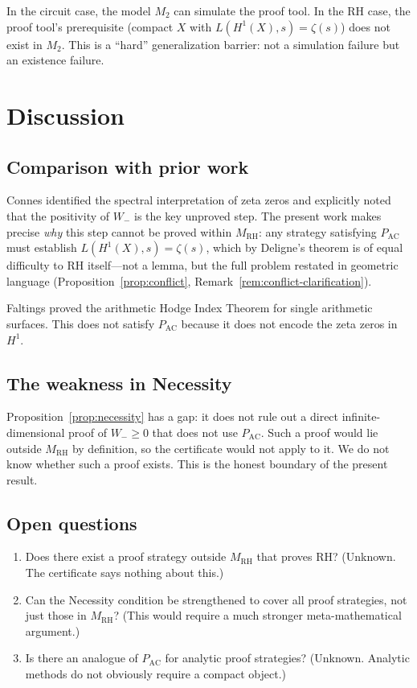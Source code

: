 \documentclass[12pt]{article}
\newcommand{\MRH}{M_{\mathrm{RH}}}
\newcommand{\PAC}{P_{\mathrm{AC}}}
\begin{document}
In the circuit case, the model $M_2$ can simulate the proof tool.
In the RH case, the proof tool's prerequisite (compact $X$ with
$L(H^1(X),s) = \zeta(s)$) does not exist in $M_2$. This is a
``hard'' generalization barrier: not a simulation failure but an
existence failure.

\section{Discussion}
\label{sec:discussion}

\subsection{Comparison with prior work}

Connes \cite{connes1999} identified the spectral interpretation of
zeta zeros and explicitly noted that the positivity of $W_-$ is the
key unproved step. The present work makes precise \emph{why} this
step cannot be proved within $\MRH$: any strategy satisfying $\PAC$
must establish $L(H^1(X),s) = \zeta(s)$, which by Deligne's theorem
is of equal difficulty to RH itself---not a lemma, but the full problem
restated in geometric language (Proposition~\ref{prop:conflict},
Remark~\ref{rem:conflict-clarification}).

Faltings \cite{faltings1984} proved the arithmetic Hodge Index Theorem
for single arithmetic surfaces. This does not satisfy $\PAC$ because
it does not encode the zeta zeros in $H^1$.

\subsection{The weakness in Necessity}

Proposition~\ref{prop:necessity} has a gap: it does not rule out a
direct infinite-dimensional proof of $W_- \geq 0$ that does not use
$\PAC$. Such a proof would lie outside $\MRH$ by definition, so the
certificate would not apply to it. We do not know whether such a proof
exists. This is the honest boundary of the present result.

\subsection{Open questions}

\begin{enumerate}
\item Does there exist a proof strategy outside $\MRH$ that proves RH?
  (Unknown. The certificate says nothing about this.)
\item Can the Necessity condition be strengthened to cover all proof
  strategies, not just those in $\MRH$? (This would require a much
  stronger meta-mathematical argument.)
\item Is there an analogue of $\PAC$ for analytic proof strategies?
  (Unknown. Analytic methods do not obviously require a compact object.)
\end{enumerate}
\end{document}
